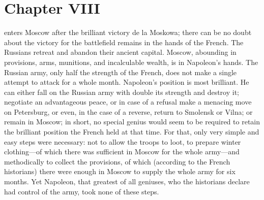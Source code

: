 
\chapter*{Chapter VIII} \ifaudio {}
\fi

 enters Moscow after the brilliant victory de la Moskowa;
there can be no doubt about the victory for the battlefield
remains in the hands of the French. The Russians retreat and
abandon their ancient capital. Moscow, abounding in provisions,
arms, munitions, and incalculable wealth, is in Napoleon's
hands. The Russian army, only half the strength of the French,
does not make a single attempt to attack for a whole
month. Napoleon's position is most brilliant. He can either fall
on the Russian army with double its strength and destroy it;
negotiate an advantageous peace, or in case of a refusal make a
menacing move on Petersburg, or even, in the case of a reverse,
return to Smolensk or Vilna; or remain in Moscow; in short, no
special genius would seem to be required to retain the brilliant
position the French held at that time.  For that, only very
simple and easy steps were necessary: not to allow the troops to
loot, to prepare winter clothing---of which there was sufficient
in Moscow for the whole army---and methodically to collect the
provisions, of which (according to the French historians) there
were enough in Moscow to supply the whole army for six
months. Yet Napoleon, that greatest of all geniuses, who the
historians declare had control of the army, took none of these
steps.


